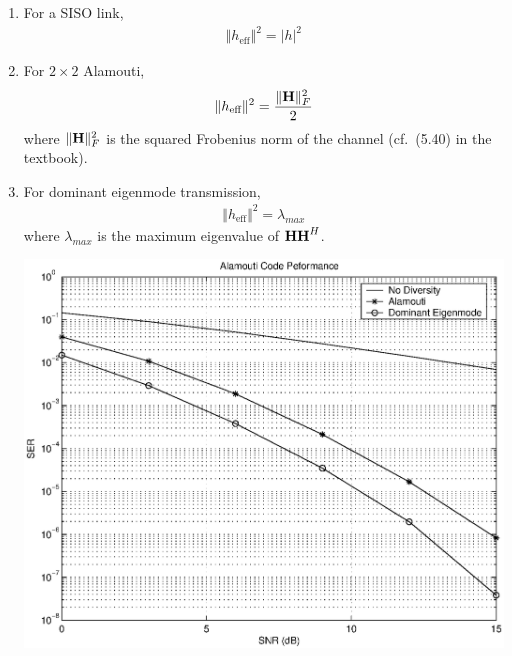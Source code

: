 \documentclass[12pt]{article}
\begin{document}
\begin{enumerate}
\item For a SISO link,
\begin{eqnarray*}
 \Vert h_\text{eff}\Vert ^2  = |h|^2
\end{eqnarray*}

\item For $2 \times 2$ Alamouti,
\begin{eqnarray*}
 \Vert h_\text{eff}\Vert ^2 = \frac{\Vert {\bf H} \Vert _F^2}{2}
\end{eqnarray*}
where $\Vert {\bf H} \Vert _F^2$ is the squared Frobenius norm of the channel (cf.~(5.40) in the textbook).

\item For dominant eigenmode transmission,
\begin{eqnarray*}
 \Vert h_\text{eff}\Vert ^2 = \lambda_{max}
\end{eqnarray*}
where $  \lambda_{max}$ is the maximum eigenvalue of ${\bf HH}^H $.
\vspace{3mm}
\begin{center}
\includegraphics[width=0.7\columnwidth]{hw3_3.eps}
\end{center}
\begin{footnotesize}

\end{footnotesize}
\end{enumerate}
\end{document}
